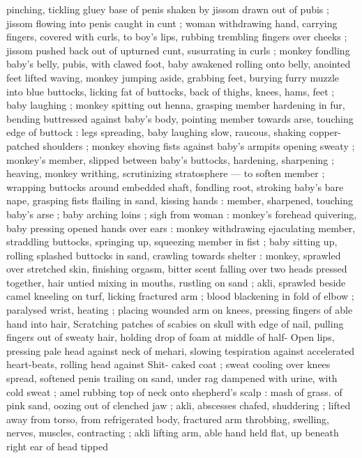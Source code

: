 pinching, tickling gluey base of penis shaken by jissom drawn out of 
pubis ; jissom flowing into penis caught in cunt ; woman withdrawing 
hand, carrying fingers, covered with curls, to boy's lips, rubbing 
trembling fingers over cheeks ; jissom pushed back out of upturned 
cunt, susurrating in curls ; monkey fondling baby's belly, pubis, with 
clawed foot, baby awakened rolling onto belly, anointed feet lifted 
waving, monkey jumping aside, grabbing feet, burying furry muzzle 
into blue buttocks, licking fat of buttocks, back of thighs, knees, 
hams, feet ; baby laughing ; monkey spitting out henna, grasping 
member hardening in fur, bending buttressed against baby's body, 
pointing member towards arse, touching edge of buttock : legs 
spreading, baby laughing slow, raucous, shaking copper-patched 
shoulders ; monkey shoving fists against baby's armpits opening 
sweaty ; monkey's member, slipped between baby's buttocks, 
hardening, sharpening ; heaving, monkey writhing, scrutinizing 
stratosphere --- to soften member ; wrapping buttocks around 
embedded shaft, fondling root, stroking baby's bare nape, grasping 
fists flailing in sand, kissing hands : member, sharpened, touching 
baby's arse ; baby arching loins ; sigh from woman : monkey's 
forehead quivering, baby pressing opened hands over ears : monkey 
withdrawing ejaculating member, straddling buttocks, springing up, 
squeezing member in fist ; baby sitting up, rolling splashed buttocks 
in sand, crawling towards shelter : monkey, sprawled over stretched 
skin, finishing orgasm, bitter scent falling over two heads pressed 
together, hair untied mixing in mouths, rustling on sand ; akli, 
sprawled beside camel kneeling on turf, licking fractured arm ; blood 
blackening in fold of elbow ; paralysed wrist, heating ; placing 
wounded arm on knees, pressing fingers of able hand into hair, 
Scratching patches of scabies on skull with edge of nail, pulling 
fingers out of sweaty hair, holding drop of foam at middle of half- 
Open lips, pressing pale head against neck of mehari, slowing 
tespiration against accelerated heart-beats, rolling head against 
Shit- caked coat ; sweat cooling over knees spread, softened penis 
trailing on sand, under rag dampened with urine, with cold sweat ; 
amel rubbing top of neck onto shepherd's scalp : mash of grass. of 
pink sand, oozing out of clenched jaw ; akli, abscesses chafed, 
shuddering ; lifted away from torso, from refrigerated body, fractured 
arm throbbing, swelling, nerves, muscles, contracting ; akli lifting 
arm, able hand held flat, up beneath right ear of head tipped 
